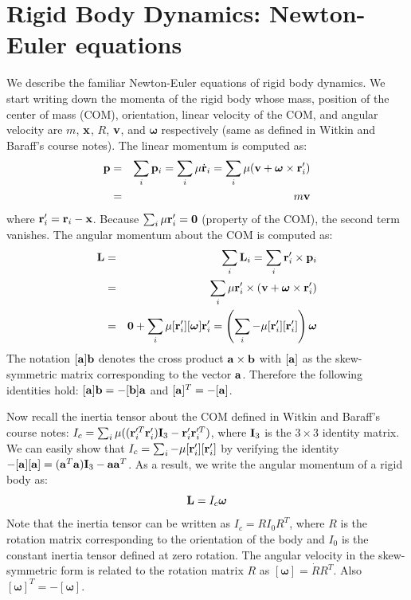 \section{Rigid Body Dynamics: Newton-Euler equations}
We describe the familiar Newton-Euler equations of rigid body dynamics. We start writing down the
momenta of the rigid body whose mass, position of the center
of mass (COM), orientation,
linear velocity of the COM, and angular velocity are $m$, $\mathbf{x}$, $R$,
$\mathbf{v}$, and $\bm{\omega}$ respectively (same as defined in Witkin and
Baraff's course notes). The linear momentum  is computed as:
\begin{eqnarray}
\mathbf{p} &=& \sum_i \mathbf{p}_i = \sum_i \mathbf{\mu} \dot{\mathbf{r}}_i = \sum_i  \mathbf{\mu} (\mathbf{v} + \bm{\omega}
    \times \mathbf{r}_i') \nonumber \\
 &=& m \mathbf{v}
\end{eqnarray}
where $\mathbf{r}_i' = \mathbf{r}_i - \mathbf{x}$. Because $\sum_i \mathbf{\mu}
\mathbf{r}_i' = \mathbf{0}$ (property of the COM), the second term vanishes. The angular momentum  about the COM is computed as:
\begin{eqnarray}
\nonumber
\mathbf{L} & = & \sum_i \mathbf{L}_i  = \sum_i \mathbf{r}_i' \times \mathbf{p}_i\\
\nonumber
& = & \sum_i \mathbf{\mu} \mathbf{r}_i' \times (\mathbf{v} + \bm{\omega} \times \mathbf{r}_i')\\
&= & \mathbf{0} + \sum_i \mathbf{\mu} [\mathbf{r}_i'][\bm{\omega}]\mathbf{r}_i' = \left ( \sum_i -\mathbf{\mu} [\mathbf{r}_i'][\mathbf{r}_i'] \right )\bm{\omega}
\end{eqnarray}
The notation $[\mathbf{a}] \mathbf{b}$ denotes the cross product $\mathbf{a}\times \mathbf{b}$ with $[\mathbf{a}]$ as the skew-symmetric matrix corresponding to the vector $\mathbf{a}$. Therefore the following identities hold: $[\mathbf{a}]\mathbf{b} = -[\mathbf{b}]\mathbf{a}$ and $[\mathbf{a}]^T = -[\mathbf{a}]$.

Now recall the inertia tensor about the COM defined in Witkin and
Baraff's course notes: $I_c = \sum_i \mathbf{\mu} ((\mathbf{r}_i'^T
\mathbf{r}_i')\mathbf{I}_3 - \mathbf{r}_i' \mathbf{r}_i'^T)$, where $\mathbf{I}_3$ is the $3\times 3$
identity matrix. We can easily show that
$I_c = \sum_i -\mathbf{\mu} [\mathbf{r}_i'][\mathbf{r}_i']$ by verifying the
identity $-[\mathbf{a}][\mathbf{a}] = (\mathbf{a}^T\mathbf{a}) \mathbf{I}_3  -
\mathbf{a}\mathbf{a}^T$. As a result, we write the angular momentum of a rigid body as:
\begin{equation}
\mathbf{L} = I_c \bm{\omega}
\end{equation}
Note that the inertia tensor can be written as $I_c = RI_0R^T$, where $R$ is the rotation matrix corresponding to the orientation of the body and $I_0$ is the constant inertia tensor defined at zero rotation. The angular velocity in the skew-symmetric form is related to the rotation matrix $R$ as $[\bm{\omega}] = \dot{R}R^T$. Also $[\bm{\omega}]^T = -[\bm{\omega}]$.

